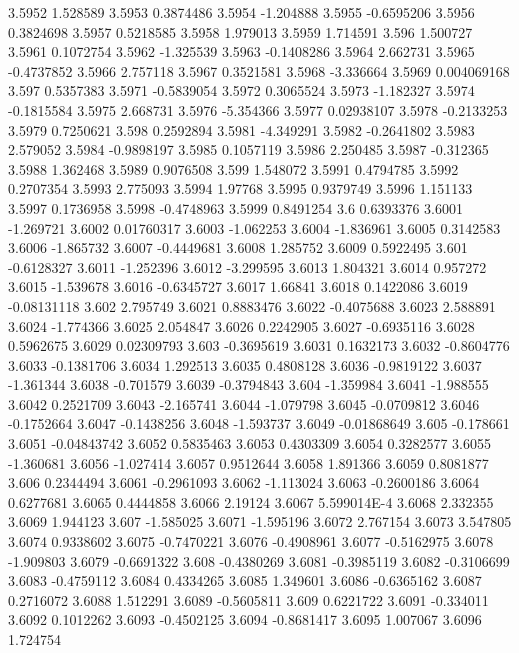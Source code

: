 3.5952  1.528589
3.5953  0.3874486
3.5954  -1.204888
3.5955  -0.6595206
3.5956  0.3824698
3.5957  0.5218585
3.5958  1.979013
3.5959  1.714591
3.596  1.500727
3.5961  0.1072754
3.5962  -1.325539
3.5963  -0.1408286
3.5964  2.662731
3.5965  -0.4737852
3.5966  2.757118
3.5967  0.3521581
3.5968  -3.336664
3.5969  0.004069168
3.597  0.5357383
3.5971  -0.5839054
3.5972  0.3065524
3.5973  -1.182327
3.5974  -0.1815584
3.5975  2.668731
3.5976  -5.354366
3.5977  0.02938107
3.5978  -0.2133253
3.5979  0.7250621
3.598  0.2592894
3.5981  -4.349291
3.5982  -0.2641802
3.5983  2.579052
3.5984  -0.9898197
3.5985  0.1057119
3.5986  2.250485
3.5987  -0.312365
3.5988  1.362468
3.5989  0.9076508
3.599  1.548072
3.5991  0.4794785
3.5992  0.2707354
3.5993  2.775093
3.5994  1.97768
3.5995  0.9379749
3.5996  1.151133
3.5997  0.1736958
3.5998  -0.4748963
3.5999  0.8491254
3.6  0.6393376
3.6001  -1.269721
3.6002  0.01760317
3.6003  -1.062253
3.6004  -1.836961
3.6005  0.3142583
3.6006  -1.865732
3.6007  -0.4449681
3.6008  1.285752
3.6009  0.5922495
3.601  -0.6128327
3.6011  -1.252396
3.6012  -3.299595
3.6013  1.804321
3.6014  0.957272
3.6015  -1.539678
3.6016  -0.6345727
3.6017  1.66841
3.6018  0.1422086
3.6019  -0.08131118
3.602  2.795749
3.6021  0.8883476
3.6022  -0.4075688
3.6023  2.588891
3.6024  -1.774366
3.6025  2.054847
3.6026  0.2242905
3.6027  -0.6935116
3.6028  0.5962675
3.6029  0.02309793
3.603  -0.3695619
3.6031  0.1632173
3.6032  -0.8604776
3.6033  -0.1381706
3.6034  1.292513
3.6035  0.4808128
3.6036  -0.9819122
3.6037  -1.361344
3.6038  -0.701579
3.6039  -0.3794843
3.604  -1.359984
3.6041  -1.988555
3.6042  0.2521709
3.6043  -2.165741
3.6044  -1.079798
3.6045  -0.0709812
3.6046  -0.1752664
3.6047  -0.1438256
3.6048  -1.593737
3.6049  -0.01868649
3.605  -0.178661
3.6051  -0.04843742
3.6052  0.5835463
3.6053  0.4303309
3.6054  0.3282577
3.6055  -1.360681
3.6056  -1.027414
3.6057  0.9512644
3.6058  1.891366
3.6059  0.8081877
3.606  0.2344494
3.6061  -0.2961093
3.6062  -1.113024
3.6063  -0.2600186
3.6064  0.6277681
3.6065  0.4444858
3.6066  2.19124
3.6067  5.599014E-4
3.6068  2.332355
3.6069  1.944123
3.607  -1.585025
3.6071  -1.595196
3.6072  2.767154
3.6073  3.547805
3.6074  0.9338602
3.6075  -0.7470221
3.6076  -0.4908961
3.6077  -0.5162975
3.6078  -1.909803
3.6079  -0.6691322
3.608  -0.4380269
3.6081  -0.3985119
3.6082  -0.3106699
3.6083  -0.4759112
3.6084  0.4334265
3.6085  1.349601
3.6086  -0.6365162
3.6087  0.2716072
3.6088  1.512291
3.6089  -0.5605811
3.609  0.6221722
3.6091  -0.334011
3.6092  0.1012262
3.6093  -0.4502125
3.6094  -0.8681417
3.6095  1.007067
3.6096  1.724754

